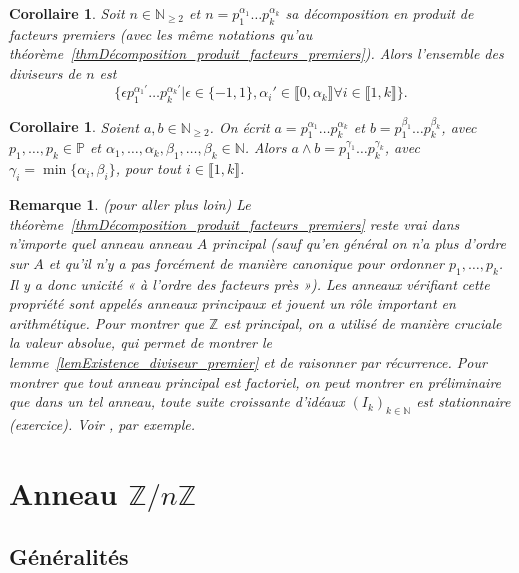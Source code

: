 \documentclass[12pt]{report}
\newtheorem*{rem}{Remarque}
\newtheorem{Cor}[thm]{Corollaire}
\newcommand{\N}{\mathbb{N}}
\newcommand{\Z}{\mathbb{Z}}
\begin{document}
\begin{Cor}
Soit $n\in \N_{\geq 2}$ et $n=p_1^{\alpha_1}\ldots p_k^{\alpha_k}$ sa décomposition en produit de facteurs premiers (avec les même notations qu'au théorème~\ref{thmDécomposition_produit_facteurs_premiers}). Alors l'ensemble des diviseurs de $n$ est \[\{\epsilon p_1^{\alpha_1'}\ldots p_k^{\alpha_k'}|\epsilon\in \{-1,1\}, \alpha_i'\in \llbracket 0,\alpha_k\rrbracket\forall i\in \llbracket 1,k\rrbracket\}.\]
\end{Cor}

\begin{Cor}\label{corExpression_PGCD}
Soient $a,b\in \N_{\geq 2}$. On écrit $a=p_1^{\alpha_1}\ldots p_k^{\alpha_k}$ et $b=p_1^{\beta_1}\ldots p_{k}^{\beta_k}$, avec $p_1,\ldots,p_k\in \mathbb{P}$ et $\alpha_1,\ldots,\alpha_k,\beta_1,\ldots,\beta_k\in \N$. Alors $a\wedge b=p_1^{\gamma_1}\ldots p_k^{\gamma_k}$, avec $\gamma_i=\min \{\alpha_i,\beta_i\}$, pour tout $i\in \llbracket 1,k\rrbracket$.
\end{Cor}

\begin{rem}(pour aller plus loin)
Le théorème~\ref{thmDécomposition_produit_facteurs_premiers} reste vrai dans n'importe quel anneau anneau $A$ principal (sauf qu'en général on n'a plus d'ordre sur $A$ et qu'il n'y a pas forcément de manière canonique pour ordonner $p_1,\ldots, p_k$. Il y a donc unicité « à l'ordre des facteurs près »). Les anneaux vérifiant cette propriété sont appelés anneaux principaux et jouent un rôle important en arithmétique. Pour montrer que $\Z$ est principal, on a utilisé de manière cruciale la valeur absolue, qui permet de montrer le lemme~\ref{lemExistence_diviseur_premier} et de raisonner par récurrence. Pour montrer que tout anneau principal est factoriel, on peut montrer en préliminaire que dans un tel anneau, toute suite croissante d'idéaux $(I_k)_{k\in \N}$ est stationnaire (exercice). Voir \cite[Chapitre 11]{combes1998algebre}, par exemple.

\end{rem}


\chapter{Anneau $\mathbb{Z}/n \mathbb{Z}$}


\section{Généralités}
\end{document}
